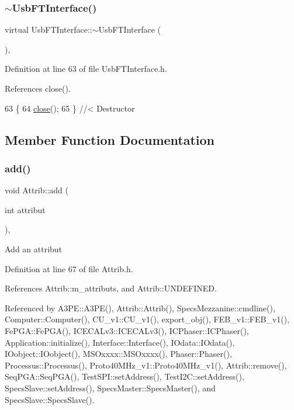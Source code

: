 \subsubsection{\texorpdfstring{$\sim$\+Usb\+F\+T\+Interface()}{~UsbFTInterface()}}
{\footnotesize\ttfamily virtual Usb\+F\+T\+Interface\+::$\sim$\+Usb\+F\+T\+Interface (\begin{DoxyParamCaption}{ }\end{DoxyParamCaption})\hspace{0.3cm}{\ttfamily [inline]}, {\ttfamily [virtual]}}



Definition at line 63 of file Usb\+F\+T\+Interface.\+h.



References close().


\begin{DoxyCode}
63                             \{
64     \hyperlink{classUsbFTInterface_ad555e20eb4b80da1d3cac5a8c6509bb5}{close}();
65   \} \textcolor{comment}{//< Destructor}
\end{DoxyCode}


\subsection{Member Function Documentation}
\mbox{\label{classAttrib_a235f773af19c900264a190b00a3b4ad7}} 
\subsubsection{\texorpdfstring{add()}{add()}}
{\footnotesize\ttfamily void Attrib\+::add (\begin{DoxyParamCaption}\item[{int}]{attribut }\end{DoxyParamCaption})\hspace{0.3cm}{\ttfamily [inline]}, {\ttfamily [inherited]}}

Add an attribut 

Definition at line 67 of file Attrib.\+h.



References Attrib\+::m\+\_\+attributs, and Attrib\+::\+U\+N\+D\+E\+F\+I\+N\+ED.



Referenced by A3\+P\+E\+::\+A3\+P\+E(), Attrib\+::\+Attrib(), Specs\+Mezzanine\+::cmdline(), Computer\+::\+Computer(), C\+U\+\_\+v1\+::\+C\+U\+\_\+v1(), export\+\_\+obj(), F\+E\+B\+\_\+v1\+::\+F\+E\+B\+\_\+v1(), Fe\+P\+G\+A\+::\+Fe\+P\+G\+A(), I\+C\+E\+C\+A\+Lv3\+::\+I\+C\+E\+C\+A\+Lv3(), I\+C\+Phaser\+::\+I\+C\+Phaser(), Application\+::initialize(), Interface\+::\+Interface(), I\+Odata\+::\+I\+Odata(), I\+Oobject\+::\+I\+Oobject(), M\+S\+Oxxxx\+::\+M\+S\+Oxxxx(), Phaser\+::\+Phaser(), Processus\+::\+Processus(), Proto40\+M\+Hz\+\_\+v1\+::\+Proto40\+M\+Hz\+\_\+v1(), Attrib\+::remove(), Seq\+P\+G\+A\+::\+Seq\+P\+G\+A(), Test\+S\+P\+I\+::set\+Address(), Test\+I2\+C\+::set\+Address(), Specs\+Slave\+::set\+Address(), Specs\+Master\+::\+Specs\+Master(), and Specs\+Slave\+::\+Specs\+Slave().



